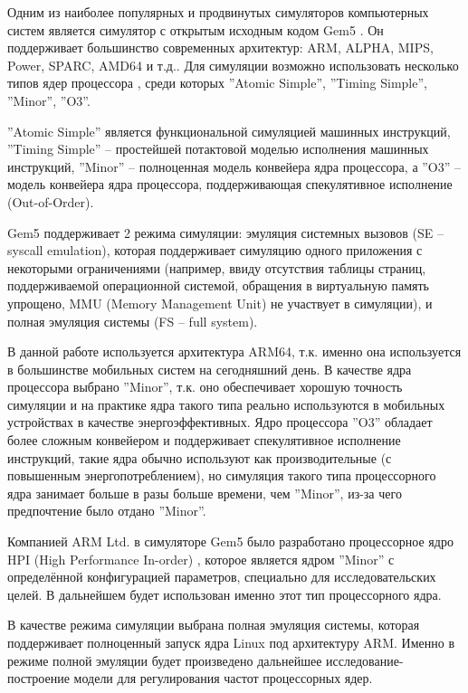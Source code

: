     Одним из наиболее популярных и продвинутых симуляторов компьютерных систем является симулятор
    с открытым исходным кодом Gem5 \cite{binkert2011gem5}. Он поддерживает большинство современных
    архитектур: ARM, ALPHA, MIPS, Power, SPARC, AMD64 и т.д.. Для симуляции возможно использовать
    несколько типов ядер процессора \cite{gem52017ArchExpl}, среди которых ''Atomic Simple'',
    ''Timing Simple'', ''Minor'', ''O3''.

    ''Atomic Simple'' является функциональной симуляцией
    машинных инструкций, ''Timing Simple'' -- простейшей потактовой моделью исполнения машинных
    инструкций, ''Minor'' -- полноценная модель конвейера ядра процессора,
    а ''O3'' -- модель конвейера ядра процессора, поддерживающая спекулятивное исполнение (Out-of-Order).

    Gem5 поддерживает 2 режима симуляции: эмуляция системных вызовов (SE -- syscall emulation), которая
    поддерживает симуляцию одного приложения с некоторыми ограничениями (например, ввиду отсутствия таблицы
    страниц, поддерживаемой операционной системой, обращения в виртуальную память упрощено, MMU (Memory
    Management Unit) не участвует в симуляции), и полная эмуляция системы (FS -- full system).

    В данной работе используется архитектура ARM64, т.к. именно она используется в большинстве мобильных
    систем на сегодняшний день. В качестве ядра процессора выбрано ''Minor'', т.к. оно обеспечивает
    хорошую точность симуляции и на практике ядра такого типа реально используются в мобильных
    устройствах в качестве энергоэффективных. Ядро процессора ''O3'' обладает более сложным конвейером и
    поддерживает спекулятивное исполнение инструкций, такие ядра обычно используют как производительные
    (с повышенным энергопотреблением), но симуляция такого типа процессорного ядра занимает больше
    в разы больше времени, чем ''Minor'', из-за чего предпочтение было отдано ''Minor''.

    Компанией ARM Ltd. в симуляторе Gem5 было разработано процессорное ядро HPI (High Performance In-order)
    \cite{gem52017HPI}, которое является ядром ''Minor'' с определённой конфигурацией параметров,
    специально для исследовательских целей. В дальнейшем будет использован именно этот тип процессорного ядра.

    В качестве режима симуляции выбрана полная эмуляция системы, которая поддерживает полноценный запуск
    ядра Linux под архитектуру ARM. Именно в режиме полной эмуляции будет произведено дальнейшее
    исследование-построение модели для регулирования частот процессорных ядер.

\newpage
